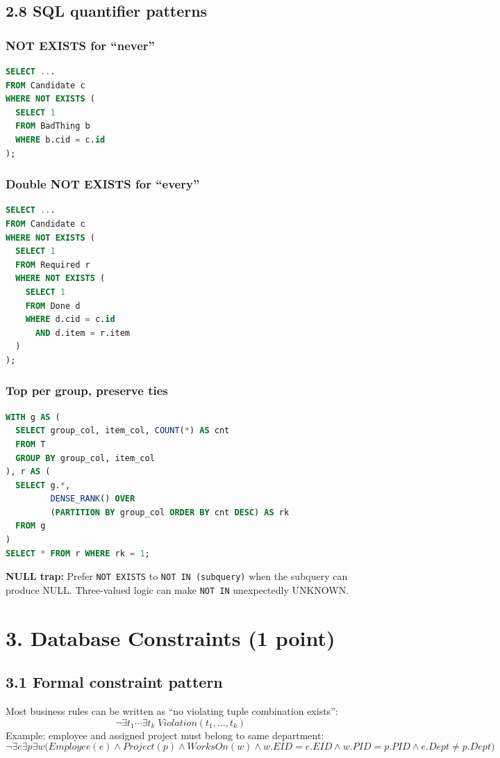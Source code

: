 \documentclass[10pt,a4paper]{article}
\begin{document}
\subsection{2.8 SQL quantifier patterns}
\subsubsection*{NOT EXISTS for ``never''}
\begin{lstlisting}[language=SQL]
SELECT ...
FROM Candidate c
WHERE NOT EXISTS (
  SELECT 1
  FROM BadThing b
  WHERE b.cid = c.id
);
\end{lstlisting}

\subsubsection*{Double NOT EXISTS for ``every''}
\begin{lstlisting}[language=SQL]
SELECT ...
FROM Candidate c
WHERE NOT EXISTS (
  SELECT 1
  FROM Required r
  WHERE NOT EXISTS (
    SELECT 1
    FROM Done d
    WHERE d.cid = c.id
      AND d.item = r.item
  )
);
\end{lstlisting}

\subsubsection*{Top per group, preserve ties}
\begin{lstlisting}[language=SQL]
WITH g AS (
  SELECT group_col, item_col, COUNT(*) AS cnt
  FROM T
  GROUP BY group_col, item_col
), r AS (
  SELECT g.*,
         DENSE_RANK() OVER
         (PARTITION BY group_col ORDER BY cnt DESC) AS rk
  FROM g
)
SELECT * FROM r WHERE rk = 1;
\end{lstlisting}

\begin{warningbox}
\textbf{NULL trap:} Prefer \texttt{NOT EXISTS} to \texttt{NOT IN (subquery)} when the subquery can produce NULL. Three-valued logic can make \texttt{NOT IN} unexpectedly UNKNOWN.
\end{warningbox}

\section{3. Database Constraints (1 point)}

\subsection{3.1 Formal constraint pattern}
Most business rules can be written as ``no violating tuple combination exists'':
\[
\boxed{\neg\exists t_1\cdots\exists t_k\;Violation(t_1,\ldots,t_k)}
\]
Example: employee and assigned project must belong to same department:
\[
\neg\exists e\exists p\exists w\big(
Employee(e)\land Project(p)\land WorksOn(w)\land
w.EID=e.EID\land w.PID=p.PID\land e.Dept\neq p.Dept
\big)
\]
\end{document}
